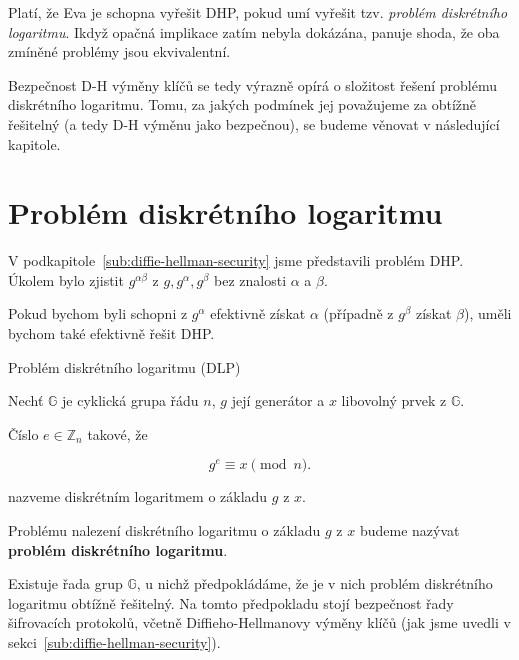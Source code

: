 \documentclass[
  program=infoi,
  biblatex,
  figures=false,
  glossaries,
  index
]{kidiplom}
\begin{document}

        Platí, že Eva je schopna vyřešit DHP, pokud umí vyřešit tzv. \emph{problém diskrétního logaritmu}.
        Ikdyž opačná implikace zatím nebyla dokázána, panuje shoda, že oba zmíněné problémy jsou ekvivalentní.

        Bezpečnost D-H výměny klíčů se tedy výrazně opírá o složitost řešení problému diskrétního logaritmu.
        Tomu, za jakých podmínek jej považujeme za obtížně řešitelný (a tedy D-H výměnu jako bezpečnou), se budeme věnovat v následující kapitole.
    

\section{Problém diskrétního logaritmu}\label{sec:discrete-log}
    
        V podkapitole~\ref{sub:diffie-hellman-security} jsme představili problém DHP.
        Úkolem bylo zjistit $g^{\alpha \beta}$ z $g, g^\alpha, g^\beta$ bez znalosti $\alpha$ a $\beta$.

        Pokud bychom byli schopni z $g^\alpha$ efektivně získat $\alpha$ (případně z $g^\beta$ získat $\beta$), uměli bychom také
        efektivně řešit DHP.

        \begin{definition}\label{def:dlp}
            Problém diskrétního logaritmu (DLP)
            
            Nechť $\mathbb{G}$ je cyklická grupa řádu $n$, $g$ její generátor a $x$ libovolný prvek z $\mathbb{G}$.

            Číslo $e \in \mathbb{Z}_n$ takové, že

                \begin{equation}\label{eq:discrete-log-1}
                    g^e \equiv x \pmod{n}.
                \end{equation}
            
            nazveme diskrétním logaritmem o základu $g$ z $x$.

            Problému nalezení diskrétního logaritmu o základu $g$ z $x$ budeme nazývat \textbf{problém diskrétního logaritmu}.

        \end{definition}
        
        Existuje řada grup $\mathbb{G}$, u nichž předpokládáme, že je v nich problém diskrétního logaritmu obtížně řešitelný.
        Na tomto předpokladu stojí bezpečnost řady šifrovacích protokolů, včetně Diffieho-Hellmanovy výměny klíčů
        (jak jsme uvedli v sekci~\ref{sub:diffie-hellman-security}).
\end{document}
